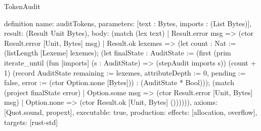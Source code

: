 \begin{lexlean}{TokenAudit}
\begin{semanticmodule}
definition{
  name: auditTokens,
  parameters: [text : Bytes, imports : (List Bytes)],
  result: (Result Unit Bytes),
  body: (match (lex text)
    | Result.error msg => (ctor Result.error [Unit, Bytes] msg)
    | Result.ok lexemes => (let count : Nat := (listLength [Lexeme] lexemes); (let finalState : AuditState := (first (prim iterate_until (fun [imports] (s : AuditState) => (stepAudit imports s)) (count + 1) (record AuditState {remaining := lexemes, attributeDepth := 0, pending := false, error := (ctor Option.none [Bytes])}) : (AuditState * Bool))); (match (project finalState error)
      | Option.some msg => (ctor Result.error [Unit, Bytes] msg)
      | Option.none => (ctor Result.ok [Unit, Bytes] ()))))),
  axioms: [Quot.sound, propext],
  executable: true,
  production: {effects: [allocation, overflow], targets: [rust-std]}
}
\end{semanticmodule}
\end{lexlean}
